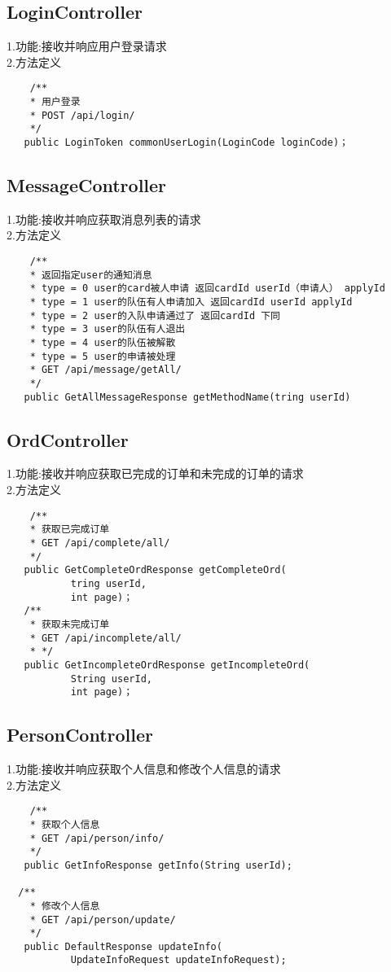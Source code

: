 \subsection{LoginController}
1.功能:接收并响应用户登录请求 \\
2.方法定义
\begin{lstlisting}
    /**
    * 用户登录
    * POST /api/login/
    */
   public LoginToken commonUserLogin(LoginCode loginCode)；
\end{lstlisting}

\subsection{MessageController}
1.功能:接收并响应获取消息列表的请求 \\
2.方法定义
\begin{lstlisting}
    /**
    * 返回指定user的通知消息
    * type = 0 user的card被人申请 返回cardId userId（申请人） applyId
    * type = 1 user的队伍有人申请加入 返回cardId userId applyId
    * type = 2 user的入队申请通过了 返回cardId 下同
    * type = 3 user的队伍有人退出
    * type = 4 user的队伍被解散
    * type = 5 user的申请被处理
    * GET /api/message/getAll/
    */
   public GetAllMessageResponse getMethodName(tring userId) 
\end{lstlisting}

\subsection{OrdController}
1.功能:接收并响应获取已完成的订单和未完成的订单的请求 \\
2.方法定义
\begin{lstlisting}
    /**
    * 获取已完成订单
    * GET /api/complete/all/
    */
   public GetCompleteOrdResponse getCompleteOrd(
           tring userId,
           int page)；
   /**
    * 获取未完成订单
    * GET /api/incomplete/all/
    * */
   public GetIncompleteOrdResponse getIncompleteOrd(
           String userId,
           int page)；
\end{lstlisting}

\subsection{PersonController}
1.功能:接收并响应获取个人信息和修改个人信息的请求 \\
2.方法定义
\begin{lstlisting}
    /**
    * 获取个人信息
    * GET /api/person/info/
    */
   public GetInfoResponse getInfo(String userId);
   
  /**
    * 修改个人信息
    * GET /api/person/update/
    */
   public DefaultResponse updateInfo(
           UpdateInfoRequest updateInfoRequest);
\end{lstlisting}

